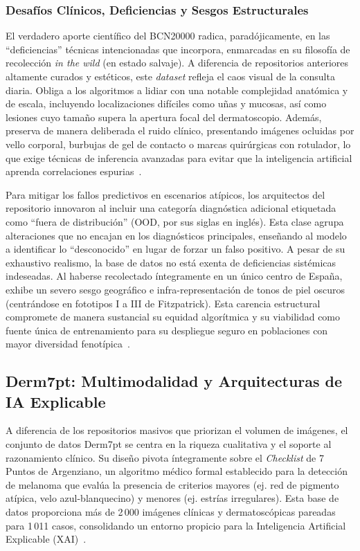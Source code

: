 \subsubsection{Desafíos Clínicos, Deficiencias y Sesgos Estructurales}

El verdadero aporte científico del BCN20000 radica, paradójicamente, en las ``deficiencias'' técnicas 
intencionadas que incorpora, enmarcadas en su filosofía de recolección \textit{in the wild} (en estado salvaje). 
A diferencia de repositorios anteriores altamente curados y estéticos, este \textit{dataset} refleja el 
caos visual de la consulta diaria. Obliga a los algoritmos a lidiar con una notable complejidad anatómica 
y de escala, incluyendo localizaciones difíciles como uñas y mucosas, así como lesiones cuyo tamaño supera 
la apertura focal del dermatoscopio. Además, preserva de manera deliberada el ruido clínico, presentando 
imágenes ocluidas por vello corporal, burbujas de gel de contacto o marcas quirúrgicas con rotulador, 
lo que exige técnicas de inferencia avanzadas para evitar que la inteligencia artificial aprenda correlaciones 
espurias~\cite{scidata_bcn20000}.

Para mitigar los fallos predictivos en escenarios atípicos, los arquitectos del repositorio innovaron al 
incluir una categoría diagnóstica adicional etiquetada como ``fuera de distribución'' (OOD, por sus siglas en inglés). 
Esta clase agrupa alteraciones que no encajan en los diagnósticos principales, enseñando al modelo a 
identificar lo ``desconocido'' en lugar de forzar un falso positivo. A pesar de su exhaustivo realismo, 
la base de datos no está exenta de deficiencias sistémicas indeseadas. Al haberse recolectado íntegramente 
en un único centro de España, exhibe un severo sesgo geográfico e infra-representación de tonos de piel 
oscuros (centrándose en fototipos I a III de Fitzpatrick). Esta carencia estructural compromete de manera 
sustancial su equidad algorítmica y su viabilidad como fuente única de entrenamiento para su despliegue 
seguro en poblaciones con mayor diversidad fenotípica~\cite{arxiv_bcn20000}.

\subsection{Derm7pt: Multimodalidad y Arquitecturas de IA Explicable}\label{sec:derm7pt}

A diferencia de los repositorios masivos que priorizan el volumen de imágenes, el conjunto de datos Derm7pt 
se centra en la riqueza cualitativa y el soporte al razonamiento clínico. Su diseño pivota íntegramente sobre 
el \textit{Checklist} de 7 Puntos de Argenziano, un algoritmo médico formal establecido para la detección de 
melanoma que evalúa la presencia de criterios mayores (ej. red de pigmento atípica, velo azul-blanquecino) y 
menores (ej. estrías irregulares). Esta base de datos proporciona más de 2\,000 imágenes clínicas y 
dermatoscópicas pareadas para 1\,011 casos, consolidando un entorno propicio para la Inteligencia Artificial 
Explicable (XAI)~\cite{github_derm7pt,arxiv_derm7pt_concept}.

